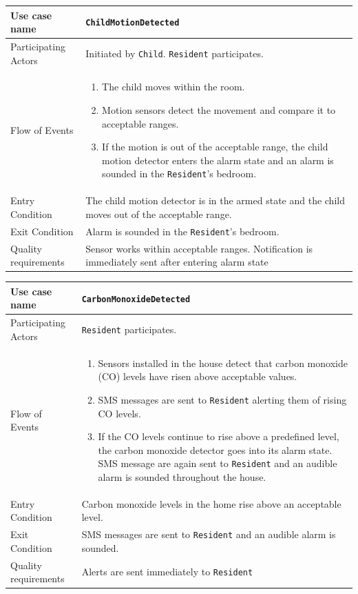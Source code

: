 \documentclass{report}
\begin{document}
\begin{tabular}{| l | p{12cm} |}
\hline
Use case name & \texttt{ChildMotionDetected} \\ \hline
Participating Actors & Initiated by \texttt{Child}. \texttt{Resident} participates. \\ \hline
Flow of Events & 

\begin{enumerate}
 \item The child moves within the room.
 \item Motion sensors detect the movement and compare it to acceptable ranges.
 \item If the motion is out of the acceptable range, the child motion
       detector enters the alarm state and an alarm is sounded in the
       \texttt{Resident}'s bedroom.
\end{enumerate}

\\ \hline

Entry Condition & The child motion detector is in the armed state and the child moves
                  out of the acceptable range. \\ \hline
Exit Condition & Alarm is sounded in the \texttt{Resident}'s bedroom. \\ \hline
Quality requirements & Sensor works within acceptable ranges. Notification is
immediately sent after entering alarm state \\ \hline

\hline
\end{tabular}

\begin{tabular}{| l | p{12cm} |}
\hline
Use case name & \texttt{CarbonMonoxideDetected} \\ \hline
Participating Actors & \texttt{Resident} participates. \\ \hline
Flow of Events & 

\begin{enumerate}
 \item Sensors installed in the house detect that carbon monoxide (CO) levels have
       risen above acceptable values.
 \item SMS messages are sent to \texttt{Resident} alerting them of rising CO levels.
 \item If the CO levels continue to rise above a predefined level, the carbon monoxide
       detector goes into its alarm state. SMS message are again sent to \texttt{Resident}
       and an audible alarm is sounded throughout the house.
\end{enumerate}

\\ \hline

Entry Condition & Carbon monoxide levels in the home rise above an acceptable level. \\ \hline
Exit Condition & SMS messages are sent to \texttt{Resident} and an audible
                 alarm is sounded. \\ \hline
Quality requirements & Alerts are sent immediately to \texttt{Resident} \\ \hline

\hline
\end{tabular}
\end{document}
